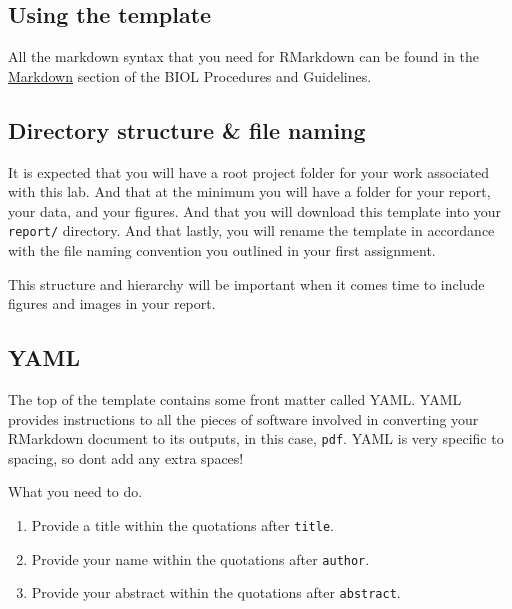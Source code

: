 \documentclass[
]{book}
\providecommand{\tightlist}{%
  \setlength{\itemsep}{0pt}\setlength{\parskip}{0pt}}
\begin{document}
\hypertarget{using-the-template}{%
\subsection*{Using the template}\label{using-the-template}}

All the markdown syntax that you need for RMarkdown can be found in the \href{https://ubco-biology.github.io/Procedures-and-Guidelines/markdown-1.html}{Markdown} section of the BIOL Procedures and Guidelines.

\hypertarget{directory-structure-file-naming}{%
\subsection*{Directory structure \& file naming}\label{directory-structure-file-naming}}

It is expected that you will have a root project folder for your work associated with this lab. And that at the minimum you will have a folder for your report, your data, and your figures. And that you will download this template into your \texttt{report/} directory. And that lastly, you will rename the template in accordance with the file naming convention you outlined in your first assignment.

This structure and hierarchy will be important when it comes time to include figures and images in your report.

\hypertarget{yaml}{%
\subsection*{YAML}\label{yaml}}

The top of the template contains some front matter called YAML. YAML provides instructions to all the pieces of software involved in converting your RMarkdown document to it\textquotesingle s outputs, in this case, \texttt{pdf}. YAML is very specific to spacing, so don\textquotesingle t add any extra spaces!

What you need to do.

\begin{enumerate}
\def\labelenumi{\arabic{enumi}.}
\tightlist
\item
  Provide a title within the quotations after \texttt{title}.
\item
  Provide your name within the quotations after \texttt{author}.
\item
  Provide your abstract within the quotations after \texttt{abstract}.
\end{enumerate}
\end{document}
